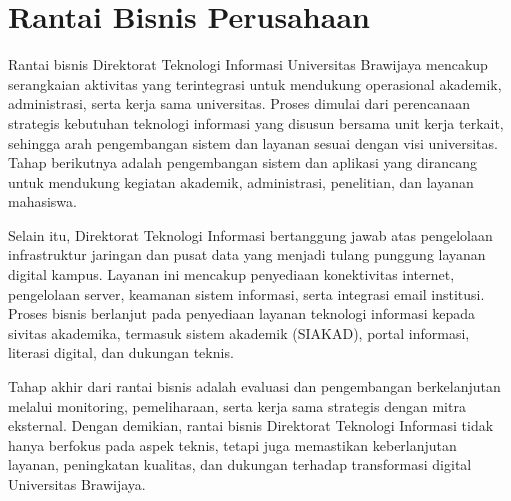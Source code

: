\section{Rantai Bisnis Perusahaan}

Rantai bisnis Direktorat Teknologi Informasi Universitas Brawijaya mencakup serangkaian aktivitas yang terintegrasi untuk mendukung operasional akademik, administrasi, serta kerja sama universitas. Proses dimulai dari perencanaan strategis kebutuhan teknologi informasi yang disusun bersama unit kerja terkait, sehingga arah pengembangan sistem dan layanan sesuai dengan visi universitas. Tahap berikutnya adalah pengembangan sistem dan aplikasi yang dirancang untuk mendukung kegiatan akademik, administrasi, penelitian, dan layanan mahasiswa. 

Selain itu, Direktorat Teknologi Informasi bertanggung jawab atas pengelolaan infrastruktur jaringan dan pusat data yang menjadi tulang punggung layanan digital kampus. Layanan ini mencakup penyediaan konektivitas internet, pengelolaan server, keamanan sistem informasi, serta integrasi email institusi. Proses bisnis berlanjut pada penyediaan layanan teknologi informasi kepada sivitas akademika, termasuk sistem akademik (SIAKAD), portal informasi, literasi digital, dan dukungan teknis. 

Tahap akhir dari rantai bisnis adalah evaluasi dan pengembangan berkelanjutan melalui monitoring, pemeliharaan, serta kerja sama strategis dengan mitra eksternal. Dengan demikian, rantai bisnis Direktorat Teknologi Informasi tidak hanya berfokus pada aspek teknis, tetapi juga memastikan keberlanjutan layanan, peningkatan kualitas, dan dukungan terhadap transformasi digital Universitas Brawijaya.

